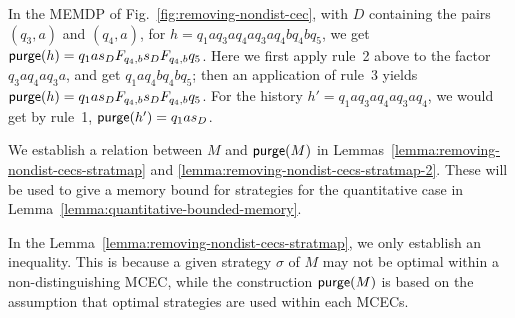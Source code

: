 \documentclass[a4paper,USenglish,cleveref, autoref, thm-restate]{lipics-v2021}
\newcommand\purge[1]{\textrm{\sf purge}(#1)}
\begin{document}
\begin{example}
  In the MEMDP of Fig.~\ref{fig:removing-nondist-cec},
  with $D$ containing the pairs $(q_3,a)$ and $(q_4,a)$, 
  for $h=q_1a q_3aq_4aq_3 a q_4 b q_4 b q_5$, we get 
  $\purge{h}=q_1a s_D F_{q_4,b} s_D F_{q_4,b} q_5$.
  Here we first apply rule~2 above to the factor $q_3aq_4aq_3 a$, and get
  $q_1 a q_4 b q_4 b q_5$; then an application of rule~3 yields
  $\purge{h}=q_1a s_D F_{q_4,b} s_D F_{q_4,b} q_5$.
  For the history $h'=q_1a q_3aq_4aq_3 a q_4$, we would get by rule~1,
  $\purge{h'}=q_1 a s_D$.
\end{example}

We establish a relation between $M$ and $\purge{M}$ in Lemmas~\ref{lemma:removing-nondist-cecs-stratmap} and \ref{lemma:removing-nondist-cecs-stratmap-2}.
These will be used to give a memory bound for strategies for the quantitative case in Lemma~\ref{lemma:quantitative-bounded-memory}.

In the Lemma~\ref{lemma:removing-nondist-cecs-stratmap}, we only establish an inequality. This is because a given strategy $\sigma$ of $M$
may not be optimal within a non-distinguishing MCEC, while the construction $\purge{M}$ is based on the assumption that optimal strategies are used within each MCECs.
\end{document}
